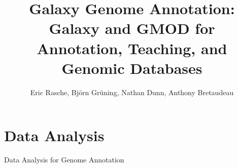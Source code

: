 \documentclass[12pt]{phage3slides} %
\title[GGA]{Galaxy Genome Annotation: Galaxy and GMOD for Annotation, Teaching, and Genomic Databases}
\author[ER, BG, ND, AB]{Eric Rasche, Bj\"orn Gr\"uning, Nathan Dunn, Anthony Bretaudeau}
\begin{document}
\frame{\titlepage}




\section{Data Analysis}
\begin{frame}{Data Analysis for Genome Annotation}
	\begin{itemize}
	\end{itemize}
\end{frame}


{%
  \begin{frame}[plain]
  \end{frame}
}
\end{document}
